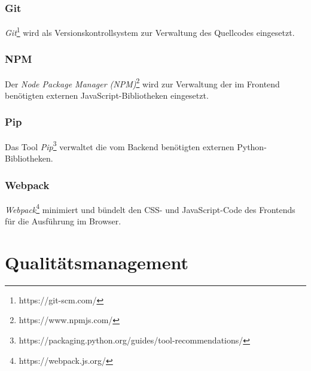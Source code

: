 \documentclass[a4paper,11pt,listof=numbered,glossary=totoc,parskip=half,toc=bib]{scrreprt}
\begin{document}
	\subsection{Git}
	\textit{Git}\footnote{https://git-scm.com/} wird als Versionskontrollsystem zur Verwaltung des Quellcodes eingesetzt.
	
	\subsection{NPM}
	Der \textit{Node Package Manager (NPM)}\footnote{https://www.npmjs.com/} wird zur Verwaltung der im Frontend benötigten externen JavaScript-Bibliotheken eingesetzt.
	
	\subsection{Pip}
	Das Tool \textit{Pip}\footnote{https://packaging.python.org/guides/tool-recommendations/} verwaltet die vom Backend benötigten externen Python-Bibliotheken.
	
	\subsection{Webpack}
	\textit{Webpack}\footnote{https://webpack.js.org/} minimiert und bündelt den CSS- und JavaScript-Code des Frontends für die Ausführung im Browser.
	

	\chapter{Qualitätsmanagement}
	
	
	\printglossaries
	\newpage	
	\printbibliography[heading=bibnumbered,title=Literaturverzeichnis]
\end{document}
